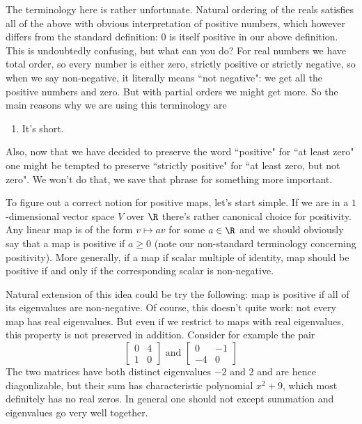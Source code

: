 The terminology here is rather unfortunate. Natural ordering of the reals satisfies all of the above with obvious interpretation of positive numbers, which however differs from the standard definition: $0$ is itself positive in our above definition. This is undoubtedly confusing, but what can you do? For real numbers we have total order, so every number is either zero, strictly positive or strictly negative, so when we say non-negative, it literally means ``not negative": we get all the positive numbers and zero. But with partial orders we might get more. So the main reasons why we are using this terminology are
\begin{enumerate}
	\item It's short.
\end{enumerate}
Also, now that we have decided to preserve the word ``positive" for ``at least zero" one might be tempted to preserve ``strictly positive" for ``at least zero, but not zero". We won't do that, we save that phrase for something more important.

To figure out a correct notion for positive maps, let's start simple. If we are in a $1$-dimensional vector space $V$ over $\R$ there's rather canonical choice for positivity. Any linear map is of the form $v \mapsto a v$ for some $a \in \R$ and we should obviously say that a map is positive if $a \geq 0$ (note our non-standard terminology concerning positivity). More generally, if a map if scalar multiple of identity, map should be positive if and only if the corresponding scalar is non-negative.

Natural extension of this idea could be try the following: map is positive if all of its eigenvalues are non-negative. Of course, this doesn't quite work: not every map has real eigenvalues. But even if we restrict to maps with real eigenvalues, this property is not preserved in addition. Consider for example the pair
\[
	\begin{bmatrix}
		0 & 4 \\
		1 & 0
	\end{bmatrix}
	\text{ and }
	\begin{bmatrix}
		0 & -1 \\
		-4 & 0
	\end{bmatrix}
\]
The two matrices have both distinct eigenvalues $- 2$ and $2$ and are hence diagonlizable, but their sum has characteristic polynomial $x^2 + 9$, which most definitely has no real zeros. In general one should not except summation and eigenvalues go very well together.


